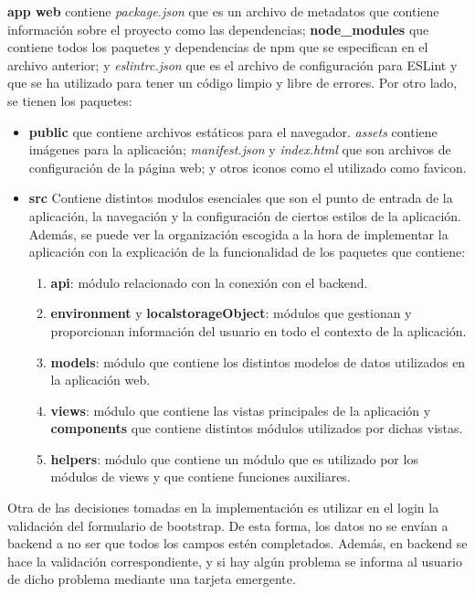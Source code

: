 \textbf{app web} contiene \textit{package.json} que es un archivo de metadatos que contiene información sobre el proyecto como las dependencias; \textbf{node\_modules} que contiene todos los paquetes y dependencias de npm que se especifican en el archivo anterior; y \textit{eslintrc.json} que es el archivo de configuración para ESLint y que se ha utilizado para tener un código limpio y libre de errores. Por otro lado, se tienen los paquetes:
\begin{itemize}
	\item \textbf{public} que contiene archivos estáticos para el navegador. \textit{assets} contiene imágenes para la aplicación; \textit{manifest.json} y \textit{index.html} que son archivos de configuración de la página web; y otros iconos como el utilizado como favicon.
	\item \textbf{src} Contiene distintos modulos esenciales que son el punto de entrada de la aplicación, la navegación y la configuración de ciertos estilos de la aplicación. Además, se puede ver la organización escogida a la hora de implementar la aplicación con la explicación de la funcionalidad de los paquetes que contiene:
	\begin{enumerate}
		\item \textbf{api}: módulo relacionado con la conexión con el backend.
		\item \textbf{environment} y \textbf{localstorageObject}: módulos que gestionan y proporcionan información del usuario en todo el contexto de la aplicación.
		\item \textbf{models}: módulo que contiene los distintos modelos de datos utilizados en la aplicación web.
		\item \textbf{views}: módulo que contiene las vistas principales de la aplicación y \textbf{components} que contiene distintos módulos utilizados por dichas vistas.
		\item \textbf{helpers}: módulo que contiene un módulo que es utilizado por los módulos de views y que contiene funciones auxiliares.
	\end{enumerate}
\end{itemize}


Otra de las decisiones tomadas en la implementación es utilizar en el login la validación del formulario de bootstrap. De esta forma, los datos no se envían a backend a no ser que todos los campos estén completados. Además, en backend se hace la validación correspondiente, y si hay algún problema se informa al usuario de dicho problema mediante una tarjeta emergente.\\

